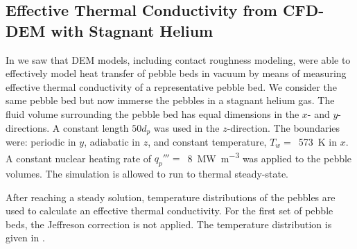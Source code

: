 \FloatBarrier
\subsection{Effective Thermal Conductivity from CFD-DEM with Stagnant Helium}\label{sec:cfd-dem-effective-conductivity}
In  we saw that DEM models, including contact roughness modeling, were able to effectively model heat transfer of pebble beds in vacuum by means of measuring effective thermal conductivity of a representative pebble bed. We consider the same pebble bed but now immerse the pebbles in a stagnant helium gas. The fluid volume surrounding the pebble bed has equal dimensions in the $x$- and $y$-directions. A constant length $50d_p$ was used in the $z$-direction. The boundaries were: periodic in $y$, adiabatic in $z$, and constant temperature, $T_w = $~\SI{573}{\kelvin} in $x$. A constant nuclear heating rate of $q_p'''=$~\SI{8}{\mega\watt\per\cubic\meter} was applied to the pebble volumes. The simulation is allowed to run to thermal steady-state. 

After reaching a steady solution, temperature distributions of the pebbles are used to calculate an effective thermal conductivity. For the first set of pebble beds, the Jeffreson correction is not applied. The temperature distribution is given in . 

